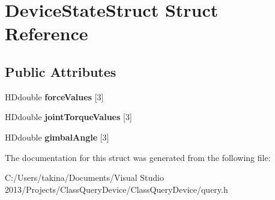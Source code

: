 \hypertarget{struct_device_state_struct}{}\section{Device\+State\+Struct Struct Reference}
\label{struct_device_state_struct}
\subsection*{Public Attributes}
\begin{DoxyCompactItemize}
\item 
\hypertarget{struct_device_state_struct_a6e8e20d39dbc7217694cf3448d0f7ba5}{}\label{struct_device_state_struct_a6e8e20d39dbc7217694cf3448d0f7ba5} 
H\+Ddouble {\bfseries force\+Values} \mbox{[}3\mbox{]}
\item 
\hypertarget{struct_device_state_struct_a5488318c4a105c4d4afe7f8b6b2027df}{}\label{struct_device_state_struct_a5488318c4a105c4d4afe7f8b6b2027df} 
H\+Ddouble {\bfseries joint\+Torque\+Values} \mbox{[}3\mbox{]}
\item 
\hypertarget{struct_device_state_struct_a90019fab37fe5bcd10ac8e8c7a7c8b47}{}\label{struct_device_state_struct_a90019fab37fe5bcd10ac8e8c7a7c8b47} 
H\+Ddouble {\bfseries gimbal\+Angle} \mbox{[}3\mbox{]}
\end{DoxyCompactItemize}


The documentation for this struct was generated from the following file\+:\begin{DoxyCompactItemize}
\item 
C\+:/\+Users/takina/\+Documents/\+Visual Studio 2013/\+Projects/\+Class\+Query\+Device/\+Class\+Query\+Device/query.\+h\end{DoxyCompactItemize}
